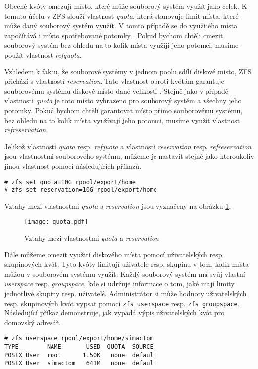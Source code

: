 Obecné kvóty omezují místo, které může souborový systém využít jako celek. K tomuto účelu v ZFS slouží vlastnost \emph{quota}, která stanovuje limit místa, které může daný souborový systém využít. V tomto případě se do využitého místa započítává i místo spotřebované potomky \cite{quotas}. Pokud bychom chtěli omezit souborový systém bez ohledu na to kolik místa využijí jeho potomci, musíme použít vlastnost \emph{refquota}.

Vzhledem k faktu, že souborové systémy v jednom poolu sdílí diskové místo, ZFS přichází s vlastností \emph{reservation}. Tato vlastnost oproti kvótám garantuje souborovému systému diskové místo dané velikosti \cite{quotas}. Stejně jako v případě vlastnosti \emph{quota} je toto místo vyhrazeno pro souborový systém a všechny jeho potomky. Pokud bychom chtěli garantovat místo přímo souborovému systému, bez ohledu na to kolik místa využívají jeho potomci, musíme využít vlastnost \emph{refreservation}.

Jelikož vlastnosti \emph{quota} resp. \emph{refquota} a vlastnosti \emph{reservation} resp. \emph{refreservation} jsou vlastnostmi souborového systému, můžeme je nastavit stejně jako kteroukoliv jinou vlastnost pomocí následujících příkazů.
\begin{verbatim}
# zfs set quota=10G rpool/export/home
# zfs set reservation=10G rpool/export/home
\end{verbatim}

Vztahy mezi vlastnostmi \emph{quota} a \emph{reservation} jsou vyznačeny na obrázku \ref{quotavsreserv}.
\begin{figure}
    \centering
    \texttt{[image: quota.pdf]}
    \caption{Vztahy mezi vlastnostmi \emph{quota} a \emph{reservation}}
    \label{quotavsreserv}
\end{figure}

Dále můžeme omezit využití diskového místa pomocí uživatelských resp. skupinových kvót. Tyto kvóty limitují uživatele resp. skupinu v tom, kolik místa můžou v souborovém systému využít. Každý souborový systém má svůj vlastní \emph{userspace} resp. \emph{groupspace}, kde si udržuje informace o tom, jaké mají limity jednotlivé skupiny resp. uživatelé.
Administrátor si může hodnoty uživatelských resp. skupinových kvót vypsat pomocí \verb|zfs userspace| resp. \verb|zfs groupspace|. Následující příkaz demonstruje, jak vypadá výpis uživatelských kvót pro domovský adresář.
\begin{verbatim}
# zfs userspace rpool/export/home/simactom
TYPE        NAME       USED  QUOTA  SOURCE
POSIX User  root      1.50K   none  default
POSIX User  simactom   641M   none  default
\end{verbatim}

